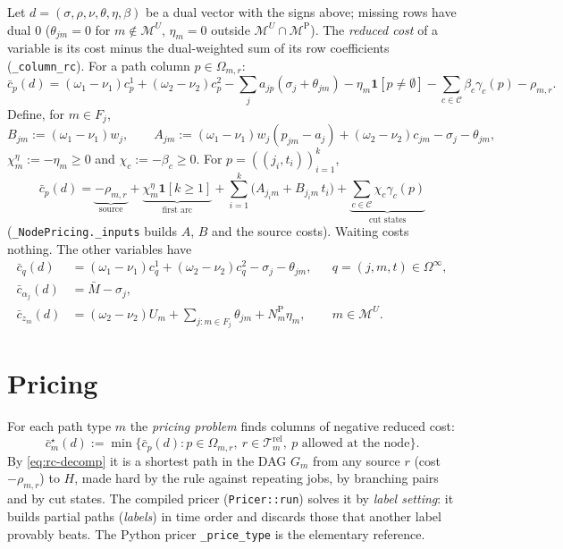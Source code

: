 \documentclass[11pt,a4paper]{article}
\theoremstyle{definition}
\theoremstyle{remark}
\newcommand{\M}{\mathcal{M}}
\newcommand{\MP}{\M^{\mathrm{P}}}
\newcommand{\MU}{\M^{U}}
\newcommand{\Rel}{\mathcal{T}^{\mathrm{rel}}}
\newcommand{\Om}{\Omega}
\newcommand{\Cuts}{\mathcal{C}}
\newcommand{\code}[1]{\texttt{#1}}
\newcommand{\ind}[1]{\mathbf{1}[#1]}
\newcommand{\rc}{\bar c}
\begin{document}
Let $d=(\sigma,\rho,\nu,\theta,\eta,\beta)$ be a dual vector with the signs
above; missing rows have dual $0$ ($\theta_{jm}=0$ for $m\notin\MU$, $\eta_m=0$
outside $\MU\cap\MP$). The \emph{reduced cost} of a variable is its cost minus
the dual-weighted sum of its row coefficients (\code{\_column\_rc}). For a path
column $p\in\Om_{m,r}$:
\begin{equation}\label{eq:rc}
\rc_p(d)=(\omega_1-\nu_1)c^1_p+(\omega_2-\nu_2)c^2_p
-\sum_{j}a_{jp}(\sigma_j+\theta_{jm})-\eta_m\ind{p\ne\emptyset}
-\sum_{c\in\Cuts}\beta_c\gamma_c(p)-\rho_{m,r}.
\end{equation}
Define, for $m\in F_j$,
\begin{equation}\label{eq:AB}
B_{jm}:=(\omega_1-\nu_1)w_j,\qquad
A_{jm}:=(\omega_1-\nu_1)w_j(p_{jm}-a_j)+(\omega_2-\nu_2)c_{jm}-\sigma_j-\theta_{jm},
\end{equation}
$\chi^\eta_m:=-\eta_m\ge0$ and $\chi_c:=-\beta_c\ge0$. For
$p=((j_i,t_i))_{i=1}^k$,
\begin{equation}\label{eq:rc-decomp}
\rc_p(d)=\underbrace{-\rho_{m,r}}_{\text{source}}
+\underbrace{\chi^{\eta}_m\ind{k\ge1}}_{\text{first arc}}
+\sum_{i=1}^k\bigl(A_{j_im}+B_{j_im}\,t_i\bigr)
+\underbrace{\sum_{c\in\Cuts}\chi_c\gamma_c(p)}_{\text{cut states}}
\end{equation}
(\code{\_NodePricing.\_inputs} builds $A$, $B$ and the source costs). Waiting
costs nothing. The other variables have
\begin{align*}
\rc_q(d)&=(\omega_1-\nu_1)c^1_q+(\omega_2-\nu_2)c^2_q-\sigma_j-\theta_{jm}, && q=(j,m,t)\in\Om^\infty,\\
\rc_{\alpha_j}(d)&=\bar M-\sigma_j,\\
\rc_{z_m}(d)&=(\omega_2-\nu_2)U_m+\textstyle\sum_{j:m\in F_j}\theta_{jm}+N^{\mathrm P}_m\eta_m, && m\in\MU.
\end{align*}

\section{Pricing}\label{sec:pricing}

For each path type $m$ the \emph{pricing problem} finds columns of negative
reduced cost:
\begin{equation}\label{eq:pricing}
\rc^\star_m(d):=\min\bigl\{\rc_p(d):p\in\Om_{m,r},\ r\in\Rel_m,\ p\text{ allowed at the node}\bigr\}.
\end{equation}
By \eqref{eq:rc-decomp} it is a shortest path in the DAG $G_m$ from any source
$r$ (cost $-\rho_{m,r}$) to $H$, made hard by the rule against repeating jobs,
by branching pairs and by cut states. The compiled pricer
(\code{Pricer::run}) solves it by \emph{label setting}: it builds partial
paths (\emph{labels}) in time order and discards those that another label
provably beats. The Python pricer \code{\_price\_type} is the elementary
reference.
\end{document}
